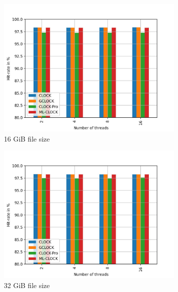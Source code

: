 \documentclass[
	12pt,
	a4paper,
	abstract,
	bibliography=totoc,
	chapterprefix,
	headings=openright,
	numbers=endperiod,
	parskip=half,
	twoside,
]{scrreprt}
\begin{document}
\begin{figure}[H]
	\centering
	\begin{subfigure}{0.4\textwidth}
		\includegraphics[width=\textwidth]{multi_16_gb_randread_normal.jpg}		
		\caption{16 GiB file size}
		\label{fig:rw_90to10 16 normal}
	\end{subfigure}
	\hfill
	\begin{subfigure}{0.4\textwidth}
		\includegraphics[width=\textwidth]{multi_32_gb_randread_normal.jpg}		
		\caption{32 GiB file size}
		\label{fig:rw_90to10 32 normal}
	\end{subfigure}
	\hfill
	\begin{subfigure}{0.4\textwidth}

\end{subfigure}
\end{figure}
\end{document}
